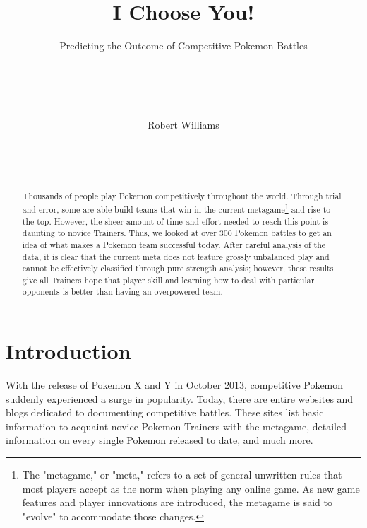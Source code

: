 \documentclass{acm_proc_article-sp}
\begin{document}
\title{I Choose You!}
\subtitle{Predicting the Outcome of Competitive Pokemon Battles}


\author{
\\
       \\
       \\
       \\
\alignauthor
Robert Williams\\
       \\
       \\
       \\
}

\maketitle
\begin{abstract}
Thousands of people play Pokemon competitively throughout the world. Through trial and error, some are able build teams that win in the current metagame\footnote{The "metagame," or "meta," refers to a set of general unwritten rules that most players accept as the norm when playing any online game. As new game features and player innovations are introduced, the metagame is said to "evolve" to accommodate those changes.} and rise to the top. However, the sheer amount of time and effort needed to reach this point is daunting to novice Trainers. Thus, we looked at over 300 Pokemon battles to get an idea of what makes a Pokemon team successful today. After careful analysis of the data, it is clear that the current meta does not feature grossly unbalanced play and cannot be effectively classified through pure strength analysis; however, these results give all Trainers hope that player skill and learning how to deal with particular opponents is better than having an overpowered team.
\end{abstract}


\section{Introduction}
With the release of Pokemon X and Y in October 2013, competitive Pokemon suddenly experienced a surge in popularity. Today, there are entire websites and blogs dedicated to documenting competitive battles. These sites list basic information to acquaint novice Pokemon Trainers with the metagame, detailed information on every single Pokemon released to date, and much more.
\end{document}

